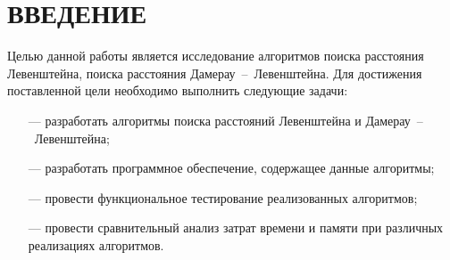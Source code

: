 \chapter*{\hfill{\centering \MakeUppercase{Введение}}\hfill} %

Целью данной работы является исследование алгоритмов поиска расстояния Левенштейна, поиска расстояния Дамерау~--~Левенштейна.
Для достижения поставленной цели необходимо выполнить следующие задачи:

\begin{itemize}
	\item[---] разработать алгоритмы поиска расстояний Левенштейна и Дамерау~--~Левенштейна;
	\item[---] разработать программное обеспечение, содержащее данные алгоритмы;
	\item[---] провести функциональное тестирование реализованных алгоритмов;
	\item[---] провести сравнительный анализ затрат времени и памяти при различных реализациях алгоритмов.
\end{itemize}

